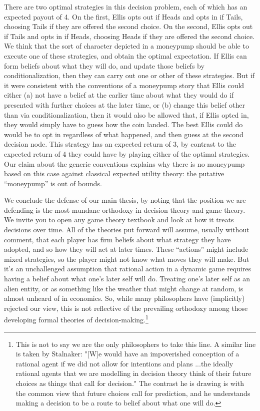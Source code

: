 \documentclass[
  11pt,
  letterpaper]{article}
\begin{document}
There are two optimal strategies in this decision problem, each of which has an expected payout of 4. On the first, Ellis opts out if Heads and opts in if Tails, choosing Tails if they are offered the second choice. On the second, Ellis opts out if Tails and opts in if Heads, choosing Heads if they are offered the second choice. We think that the sort of character depicted in a moneypump should be able to execute one of these strategies, and obtain the optimal expectation. If Ellis can form beliefs about what they will do, and update those beliefs by conditionalization, then they can carry out one or other of these strategies. But if it were consistent with the conventions of a moneypump story that Ellis could either (a) not have a belief at the earlier time about what they would do if presented with further choices at the later time, or (b) change this belief other than via conditionalization, then it would also be allowed that, if Ellis opted in, they would simply have to guess how the coin landed. The best Ellis could do would be to opt in regardless of what happened, and then guess at the second decision node. This strategy has an expected return of 3, by contrast to the expected return of 4 they could have by playing either of the optimal strategies. Our claim about the generic conventions explains why there is no moneypump based on this case against classical expected utility theory: the putative ``moneypump'' is out of bounds.

We conclude the defense of our main thesis, by noting that the position we are defending is the most mundane orthodoxy in decision theory and game theory. We invite you to open any game theory textbook and look at how it treats decisions over time. All of the theories put forward will assume, usually without comment, that each player has firm beliefs about what strategy they have adopted, and so how they will act at later times. These ``actions'' might include mixed strategies, so the player might not know what moves they will make. But it's an unchallenged assumption that rational action in a dynamic game requires having a belief about what one's later self will do. Treating one's later self as an alien entity, or as something like the weather that might change at random, is almost unheard of in economics. So, while many philosophers have (implicitly) rejected our view, this is not reflective of the prevailing orthodoxy among those developing formal theories of decision-making.\footnote{This is not to say we are the only philosophers to take this line. A similar line is taken by Stalnaker: "[W]e would have an impoverished conception of a rational agent if we did not allow for intentions and plans ...the ideally rational agents that we are modelling in decision theory think of their future choices as things that call for decision."  \citep[304]{Stalnaker1999} The contrast he is drawing is with the common view that future choices call for prediction, and he understands making a decision to be a route to belief about what one will do.}
\end{document}
